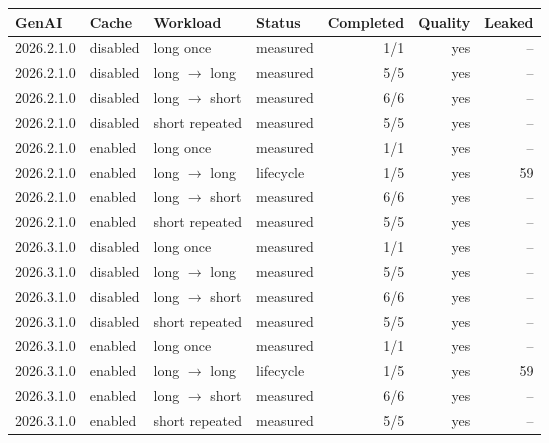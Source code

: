 \begin{tabular}{llllrrr}\toprule
GenAI & Cache & Workload & Status & Completed & Quality & Leaked\\\midrule
2026.2.1.0 & disabled & long once & measured & 1/1 & yes & -- \\
2026.2.1.0 & disabled & long $\rightarrow$ long & measured & 5/5 & yes & -- \\
2026.2.1.0 & disabled & long $\rightarrow$ short & measured & 6/6 & yes & -- \\
2026.2.1.0 & disabled & short repeated & measured & 5/5 & yes & -- \\
2026.2.1.0 & enabled & long once & measured & 1/1 & yes & -- \\
2026.2.1.0 & enabled & long $\rightarrow$ long & lifecycle & 1/5 & yes & 59 \\
2026.2.1.0 & enabled & long $\rightarrow$ short & measured & 6/6 & yes & -- \\
2026.2.1.0 & enabled & short repeated & measured & 5/5 & yes & -- \\
2026.3.1.0 & disabled & long once & measured & 1/1 & yes & -- \\
2026.3.1.0 & disabled & long $\rightarrow$ long & measured & 5/5 & yes & -- \\
2026.3.1.0 & disabled & long $\rightarrow$ short & measured & 6/6 & yes & -- \\
2026.3.1.0 & disabled & short repeated & measured & 5/5 & yes & -- \\
2026.3.1.0 & enabled & long once & measured & 1/1 & yes & -- \\
2026.3.1.0 & enabled & long $\rightarrow$ long & lifecycle & 1/5 & yes & 59 \\
2026.3.1.0 & enabled & long $\rightarrow$ short & measured & 6/6 & yes & -- \\
2026.3.1.0 & enabled & short repeated & measured & 5/5 & yes & -- \\
\bottomrule\end{tabular}
